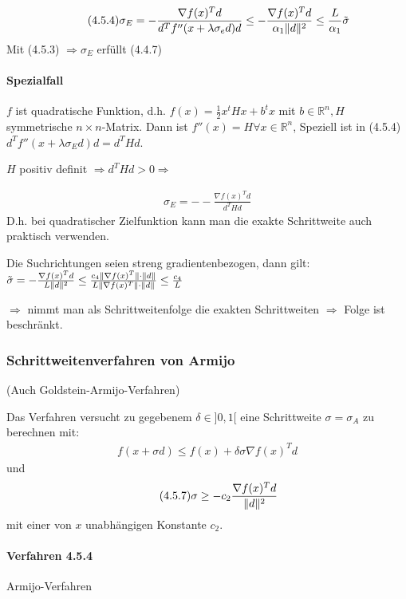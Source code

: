 \documentclass[ngerman,halfparskip]{scrartcl}
\DeclarePairedDelimiter{\norm}{\lVert}{\rVert}
\theoremstyle{definition}
\newcommand*{\R}{\mathbb{R}}      %
\begin{document}
\begin{gather*}\tag{4.5.4}
\sigma_E=-\frac {\nabla f(x)^Td}{d^Tf''(x+\lambda\sigma_e d)d}\leq -\frac{\nabla f(x)^Td}{\alpha_1\norm{d}^2}\leq \frac L{\alpha_1}\tilde \sigma
\end{gather*}
Mit (4.5.3) $\Rightarrow \sigma_E$ erfüllt (4.4.7)

\paragraph*{Spezialfall} $f$ ist quadratische Funktion, d.h. $f(x)=\frac 12 x^tHx+b^tx$ mit $ b\in\R^n, H$ symmetrische $n\times n$-Matrix. Dann ist $f''(x)=H \forall x\in\R^n$, Speziell ist in (4.5.4) $d^Tf''(x+\lambda \sigma_Ed)d=d^THd$.

$H$ positiv definit $\Rightarrow d^THd>0 \Rightarrow$

\begin{gather*}\tag{4.5.5}
\sigma_E=--\frac{\nabla f(x)^Td}{d^THd}
\end{gather*}
D.h. bei quadratischer Zielfunktion kann man die exakte Schrittweite auch praktisch verwenden.

Die Suchrichtungen seien streng gradientenbezogen, dann gilt: \\
$\tilde \sigma =-\frac {\nabla f(x)^Td}{L\norm{d}^2}\leq \frac{c_4 \norm{\nabla f(x)^T}\cdot\norm{d}}{L\norm{\nabla f(x)^T}\cdot\norm{d}}\leq \frac {c_4}L$

$\Rightarrow$ nimmt man als Schrittweitenfolge die exakten Schrittweiten $\Rightarrow$ Folge ist beschränkt.


\subsubsection{Schrittweitenverfahren von Armijo} 
(Auch Goldstein-Armijo-Verfahren)

Das Verfahren versucht zu gegebenem $\delta \in ]0,1[$ eine Schrittweite $\sigma=\sigma_A$ zu berechnen mit:
\begin{gather*}\tag{4.5.6}
f(x+\sigma d)\leq f(x)+\delta \sigma \nabla f(x)^Td
\end{gather*}
und 
\begin{gather*}\tag{4.5.7}
\sigma \geq -c_2\frac{\nabla f(x)^Td}{\norm{d}^2}
\end{gather*}
mit einer von $x$ unabhängigen Konstante $c_2$.

\paragraph{Verfahren 4.5.4} Armijo-Verfahren
\end{document}
